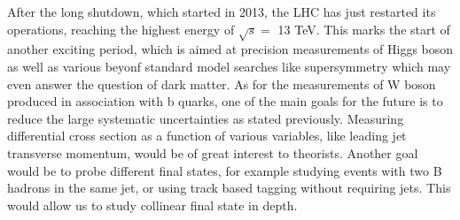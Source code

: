 After the long shutdown, which started in 2013, the LHC has just restarted its operations, reaching the highest energy of $\sqrt{s}=$ 13 TeV. This marks the start of another exciting period, which is aimed at precision measurements of Higgs boson as well as various beyonf standard model searches like supersymmetry which may even answer the question of dark matter. As for the measurements of W boson produced in association with b quarks, one of the main goals for the future is to reduce the large systematic uncertainties as stated previously. Measuring differential cross section as a function of various variables, like leading jet transverse momentum, would be of great interest to theorists. Another goal would be to probe different final states, for example studying events with two B hadrons in the same jet, or using track based tagging without requiring jets. This would allow us to study collinear final state in depth.

